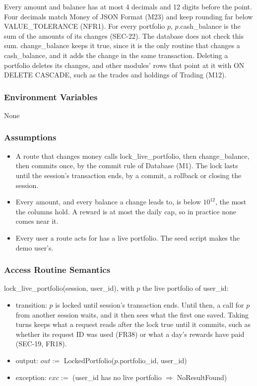 \documentclass[12pt, titlepage]{article}
\begin{document}
\medskip
{\raggedright
\noindent Every amount and balance has at most 4 decimals and 12 digits before
the point. Four decimals match Money of JSON Format (M23) and keep rounding far
below VALUE\_TOLERANCE (NFR1). For every portfolio $p$, $p$.cash\_balance is
the sum of the amounts of its changes (SEC-22). The database does not check this sum. change\_balance
keeps it true, since it is the only routine that changes a cash\_balance, and it
adds the change in the same transaction. Deleting a portfolio deletes its
changes, and other modules' rows that point at it with ON DELETE CASCADE, such
as the trades and holdings of Trading (M12).\par}

\subsubsection{Environment Variables}

None

\subsubsection{Assumptions}

\begin{itemize}
\item A route that changes money calls lock\_live\_portfolio, then
  change\_balance, then commits once, by the commit rule of Database (M1). The
  lock lasts until the session's transaction ends, by a commit, a rollback or
  closing the session.
\item Every amount, and every balance a change leads to, is below $10^{12}$,
  the most the columns hold. A reward is at most the daily cap, so in practice
  none comes near it.
\item Every user a route acts for has a live portfolio. The seed script makes
  the demo user's.
\end{itemize}

\subsubsection{Access Routine Semantics}

\noindent lock\_live\_portfolio(session, user\_id), with $p$ the live portfolio
of user\_id:
\begin{itemize}
\item transition: $p$ is locked until session's transaction ends. Until
  then, a call for $p$ from another session waits, and it then sees what the
  first one saved. Taking turns keeps what a request reads after the lock
  true until it commits, such as whether its request ID was used
  (FR38) or what a day's rewards have paid (SEC-19, FR18).
\item output: $out :=$ LockedPortfolio($p$.portfolio\_id, user\_id)
\item exception: $exc :=$ (user\_id has no live portfolio $\Rightarrow$
  NoResultFound)
\end{itemize}
\end{document}
